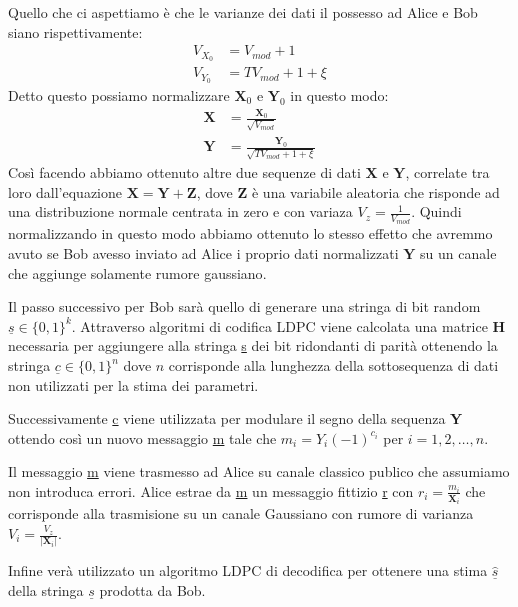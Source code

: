 Quello che ci aspettiamo \`e che le varianze dei dati il possesso ad Alice e Bob siano rispettivamente:
\begin{equation}
\begin{split}
V_{X_0} &= V_{mod} + 1 \\
V_{Y_0} &= T V_{mod} + 1 + \xi
\end{split}
\end{equation}
Detto questo possiamo normalizzare $\textbf{X}_0$ e $\textbf{Y}_0$ in questo modo:
\begin{equation}
\begin{split}
\textbf{X} &= \frac{\textbf{X}_0}{\sqrt{V_{mod}}}\\
\textbf{Y} &= \frac{\textbf{Y}_0}{\sqrt{T V_{mod} + 1 + \xi}}
\end{split}
\end{equation}
Cos\`i facendo abbiamo ottenuto altre due sequenze di dati $\textbf{X}$ e $\textbf{Y}$, correlate tra loro dall'equazione $\textbf{X} = \textbf{Y} + \textbf{Z}$, dove $\textbf{Z}$ \`e una variabile aleatoria che risponde ad una distribuzione normale centrata in zero e con variaza $V_z = \frac{1}{V_{mod}}$. Quindi normalizzando in questo modo abbiamo ottenuto lo stesso effetto che avremmo avuto se Bob avesso inviato ad Alice i proprio dati normalizzati $\textbf{Y}$ su un canale che aggiunge solamente rumore gaussiano\cite{milicevic_key_2018}.

Il passo successivo per Bob sar\`a quello di generare una stringa di bit random $\underline{s} \in \{0,1\}^k$. Attraverso algoritmi di codifica LDPC viene calcolata una matrice \textbf{H} necessaria per aggiungere alla stringa \underline{s} dei bit ridondanti di parit\`a ottenendo la stringa $\underline{c} \in \{0,1\}^n$ dove $n$ corrisponde alla lunghezza della sottosequenza di dati non utilizzati per la stima dei parametri.

Successivamente \underline{c} viene utilizzata per modulare il segno della sequenza \textbf{Y} ottendo cos\`i un nuovo messaggio \underline{m} tale che $m_i = Y_i(-1)^{c_i}$ per $i = 1,2,\dots,n$.

Il messaggio \underline{m} viene trasmesso ad Alice su canale classico publico che assumiamo non introduca errori. Alice estrae da \underline{m} un messaggio fittizio \underline{r} con $r_i = \frac{m_i}{\textbf{X}_i}$ che corrisponde alla trasmisione su un canale Gaussiano con rumore di varianza $V_i = \frac{V_z}{|\textbf{X}_i|}$.

Infine ver\`a utilizzato un algoritmo LDPC di decodifica per ottenere una stima $\hat{\underline{s}}$ della stringa $\underline s$ prodotta da Bob.


